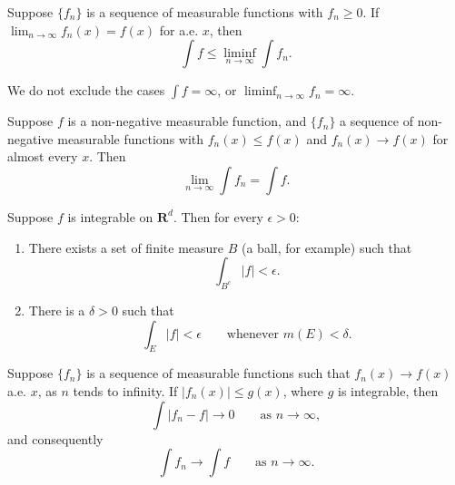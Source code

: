 \begin{lemma}[Fatou]
  Suppose $\{f_n\}$ is a sequence of measurable functions with $f_n \geq 0$.
  If $\lim_{n \to \infty} f_n(x) = f(x)$ for a.e. $x$, then
  \begin{equation}
  \int f \leq \liminf_{n \to \infty} \int f_n.
  \end{equation}
\end{lemma}

\begin{remark}
  We do not exclude the cases $\int f = \infty$,
  or $\liminf_{n \to \infty} f_n = \infty$.
\end{remark}

\begin{corollary}
  Suppose $f$ is a non-negative measurable function, and $\{f_n\}$ a sequence
  of non-negative measurable functions with
  $f_n(x) \leq f(x)$ and $f_n(x) \to f(x)$ for almost every $x$. Then
  \begin{equation}
  \lim_{n \to \infty} \int f_n = \int f.
  \end{equation}
\end{corollary}

\begin{proposition}
  Suppose $f$ is integrable on $\mathbf{R}^d$. Then for every $\epsilon > 0$:
  \begin{enumerate}
    \renewcommand{\theenumi}{\roman{enumi}}
    \item There exists a set of finite measure $B$ (a ball, for example) such that
    \begin{equation}
    \int_{B^c} |f| < \epsilon.
    \end{equation}
    \item There is a $\delta > 0$ such that
    \begin{equation}
    \int_E |f| < \epsilon \qquad \text{whenever } m(E) < \delta.
    \end{equation}
  \end{enumerate}
\end{proposition}

\begin{theorem}
  Suppose $\{f_n\}$ is a sequence of measurable functions such that
  $f_n(x) \to f(x)$ a.e. $x$, as $n$ tends to infinity.
  If $|f_n(x)| \leq g(x)$, where $g$ is integrable, then
  \begin{equation}
  \int |f_n - f| \to 0 \qquad \text{as } n \to \infty,
  \end{equation}
  and consequently
  \begin{equation}
  \int f_n \to \int f \qquad \text{as } n \to \infty.
  \end{equation}
\end{theorem}

